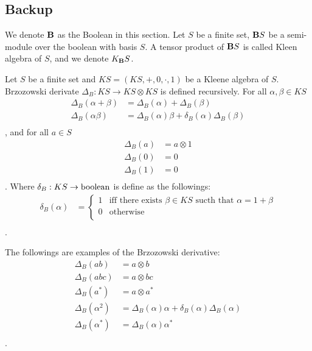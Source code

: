 \subsection{Backup}
We denote ${\mathbf{B}}$ as the Boolean in this section.
Let $S$ be a finite set,
${\mathbf{B}}S$ be a semi-module over the boolean with basis $S$.
A tensor product of ${\mathbf{B}}S$ is called Kleen algebra of $S$,
and we denote $K_{{\mathbf{B}}}S$.

\begin{definition}
Let $S$ be a finite set and $KS=(KS, +, 0, \cdot, 1)$ be a Kleene algebra of $S$.
Brzozowski derivate $\Delta_B:KS\to KS\otimes KS$ is defined recursively.
For all $\alpha,\beta\in KS$
\begin{equation}\begin{split}
	\Delta_B(\alpha + \beta) &=  \Delta_B(\alpha) + \Delta_B(\beta) \\
	\Delta_B(\alpha \beta) &= \Delta_B(\alpha) \beta + \delta_B(\alpha) \Delta_B(\beta)\\
\end{split}\end{equation}
, and for all $a\in S$
\begin{equation}\begin{split}
	\Delta_B(a) &=  a\otimes 1 \\
	\Delta_B(0) &=  0 \\
	\Delta_B(1) &=  0 \\
\end{split}\end{equation}
. Where $\delta_B:KS\to \operatorname{boolean}$ is define as the followings:
\begin{equation}\begin{split}
	\delta_B(\alpha) &= \begin{cases}
		1 & \text{iff there exists } \beta\in KS \text{ sucth that } \alpha = 1 + \beta \\
		0 & \text{otherwise} \\
		\end{cases} \\
\end{split}\end{equation}
.
\end{definition}

The followings are examples of the Brzozowski derivative:
\begin{equation}\begin{split}
	\Delta_B(ab) &= a\otimes b \\
	\Delta_B(abc) &= a\otimes bc \\
	\Delta_B(a^*) &= a\otimes a^* \\
	\Delta_B(\alpha^2) &= \Delta_B(\alpha) \alpha + \delta_B(\alpha) \Delta_B(\alpha) \\
	\Delta_B(\alpha^*) &= \Delta_B(\alpha) \alpha^* \\
\end{split}\end{equation}
.

